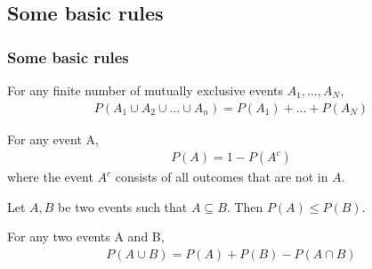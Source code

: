\subsection{Some basic rules}


\begin{frame}
    \frametitle{Some basic rules}

    \scriptsize
    \begin{probRule}
        For any finite number of mutually exclusive events $A_1,\ldots,A_N$,
        \begin{align*}
            P(A_1\cup A_2\cup\ldots\cup A_n) = P(A_1) + \ldots + P(A_N)
        \end{align*}
    \end{probRule}

    \begin{probRule}
        For any event A,
        \begin{align*}
            P(A) = 1 - P(A^c)
        \end{align*}
        where the event $A^c$ consists of all outcomes that are not in $A$.
    \end{probRule}

    \begin{probRule}
		Let $A,B$ be two events such that $A\subseteq B$. Then $P(A)\le P(B)$.
    \end{probRule}

    \begin{probRule}
        For any two events A and B,
        \begin{align*}
            P(A\cup B) = P(A) + P(B) - P(A\cap B)
        \end{align*}
    \end{probRule}

    \normalsize
\end{frame}


